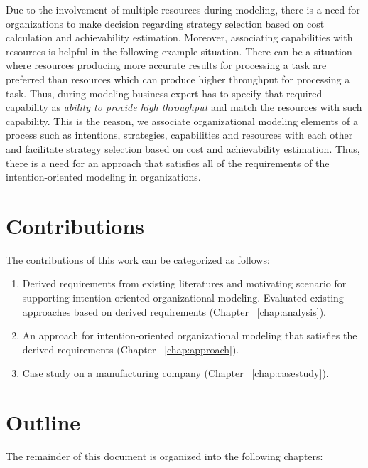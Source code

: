 Due to the involvement of multiple resources during modeling, there is a need for organizations to make decision regarding strategy selection based on cost calculation and achievability estimation. Moreover, associating capabilities with resources is helpful in the following example situation. There can be a situation where resources producing more accurate results for processing a task are preferred than resources which can produce higher throughput for processing a task. Thus, during modeling business expert has to specify that required capability as \textit{ability to provide high throughput} and match the resources with such capability. This is the reason, we associate organizational modeling elements of a process such as intentions, strategies, capabilities and resources with each other and facilitate strategy selection based on cost and achievability estimation. Thus, there is a need for an approach that satisfies all of the requirements of the intention-oriented modeling in organizations. 

\section {Contributions}
\label{sec:researchobjectives}
The contributions of this work can be categorized as follows:

\begin{enumerate}
 	\item Derived requirements from existing literatures and motivating scenario for supporting intention-oriented organizational modeling. Evaluated existing approaches based on derived requirements (Chapter  ~\ref{chap:analysis}).
 	\item An approach for intention-oriented organizational modeling that satisfies the derived requirements (Chapter ~\ref{chap:approach}).
 	\item Case study on a manufacturing company (Chapter ~\ref{chap:casestudy}).
\end{enumerate}
 
\section{Outline}
\label{sec:outline}
The remainder of this document is organized into the following chapters:

